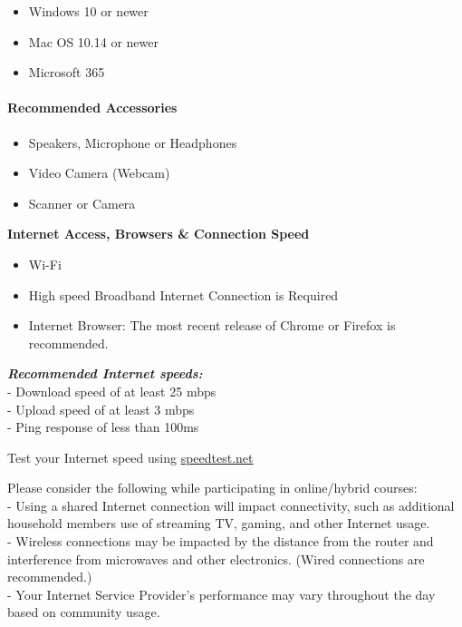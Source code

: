 \documentclass[
]{book}
\providecommand{\tightlist}{%
  \setlength{\itemsep}{0pt}\setlength{\parskip}{0pt}}
\theoremstyle{definition}
\theoremstyle{definition}
\theoremstyle{definition}
\theoremstyle{definition}
\theoremstyle{remark}
\begin{document}
\begin{itemize}
\tightlist
\item
  Windows 10 or newer\\
\item
  Mac OS 10.14 or newer\\
\item
  Microsoft 365
\end{itemize}

\hypertarget{recommended-accessories}{%
\paragraph*{Recommended Accessories}\label{recommended-accessories}}

\begin{itemize}
\tightlist
\item
  Speakers, Microphone or Headphones\\
\item
  Video Camera (Webcam)\\
\item
  Scanner or Camera
\end{itemize}

\textbf{Internet Access, Browsers \& Connection Speed}

\begin{itemize}
\tightlist
\item
  Wi-Fi\\
\item
  High speed Broadband Internet Connection is Required\\
\item
  Internet Browser: The most recent release of Chrome or Firefox is recommended.
\end{itemize}

\textbf{\emph{Recommended Internet speeds:}}\\
- Download speed of at least 25 mbps\\
- Upload speed of at least 3 mbps\\
- Ping response of less than 100ms

\begin{feedback}
Test your Internet speed using \url{speedtest.net}
\end{feedback}

Please consider the following while participating in online/hybrid courses:\\
- Using a shared Internet connection will impact connectivity, such as additional household members use of streaming TV, gaming, and other Internet usage.\\
- Wireless connections may be impacted by the distance from the router and interference from microwaves and other electronics. (Wired connections are recommended.)\\
- Your Internet Service Provider's performance may vary throughout the day based on community usage.
\end{document}
